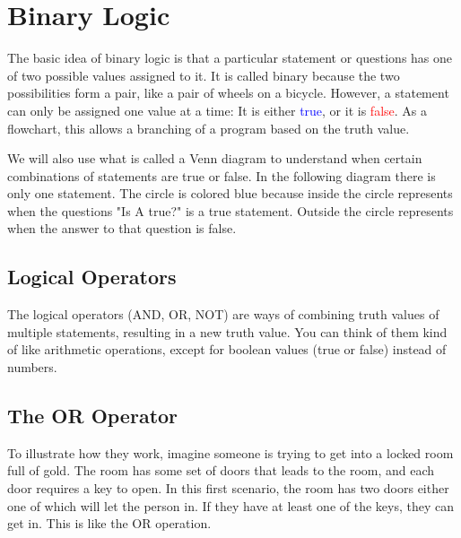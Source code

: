 \chapter{Binary Logic}

The basic idea of binary logic is that a particular statement or questions has one of two possible values assigned to it. It is called binary because the two possibilities form a pair, like a pair of wheels on a bicycle. However, a statement can only be assigned one value at a time: It is either \textcolor{blue}{true}, or it is \textcolor{red}{false}. As a flowchart, this allows a branching of a program based on the truth value.\\

\begin{center} \end{center}

We will also use what is called a Venn diagram to understand when certain combinations of statements are true or false. In the following diagram there is only one statement. The circle is colored blue because inside the circle represents when the questions "Is A true?" is a true statement. Outside the circle represents when the answer to that question is false.\\

\begin{center} \end{center}

\section{Logical Operators}

The logical operators (AND, OR, NOT) are ways of combining truth values of multiple statements, resulting in a new truth value. You can think of them kind of like arithmetic operations, except for boolean values (true or false) instead of numbers.\\

\section{The OR Operator}

To illustrate how they work, imagine someone is trying to get into a locked room full of gold. The room has some set of doors that leads to the room, and each door requires a key to open. In this first scenario, the room has two doors either one of which will let the person in. If they have at least one of the keys, they can get in. This is like the OR operation.\\

